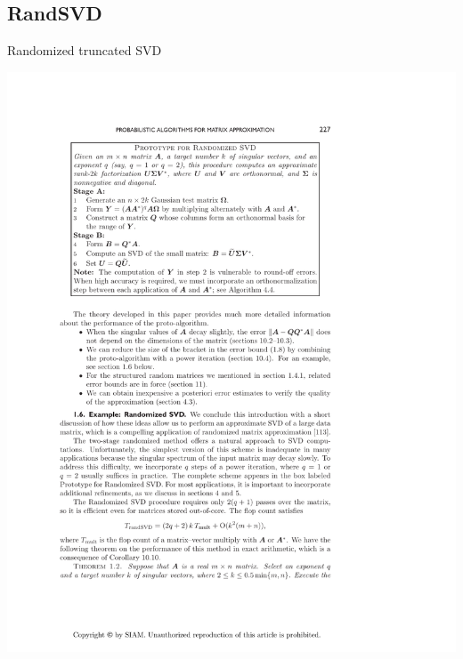 \subsection{RandSVD}
\makesubcontentsslidessec


\begin{frame}[fragile]
\fontsize{8pt}{10}\selectfont
\begin{block}{Randomized truncated SVD\footnotemark}
  \begin{minipage}{.56\textwidth}
    \begin{center}
      \includegraphics[height=.41\textheight]{../common/pics/randsvd/randSVDalg}
      \\

\end{center}
\end{minipage}
\end{block}
\end{frame}
